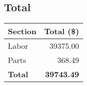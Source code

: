 \subsection{Total}
\begin{center}
\begin{tabular}{|l|r|}
\hline
\multicolumn{1}{|c}{Section} & \multicolumn{1}{|c|}{Total (\$)} \\
\hline\hline
Labor       & 39375.00 \\
\hline
Parts       & 368.49   \\
\hline
{\bf Total} & {\bf 39743.49} \\
\hline
\end{tabular}
\end{center}
